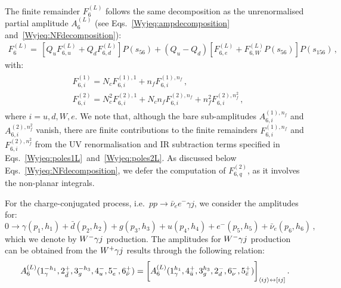 \documentclass[main.tex]{subfiles}
\begin{document}
The finite remainder $F_6^{(L)}$ follows the same decomposition as the unrenormalised partial amplitude $A_6^{(L)}$ (see Eqs.~\ref{Wyjeq:ampdecomposition} and~\ref{Wyjeq:NFdecomposition}):
\begin{equation}
\begin{aligned}
F_{6}^{(L)} = \,  \left[ Q_u F^{(L)}_{6,u} + Q_d F^{(L)}_{6,d}  \right] P(s_{56})  + (Q_u - Q_d) \left[ F^{(L)}_{6,e} + F^{(L)}_{6,W} P(s_{56}) \right] P(s_{156}) \,,
\end{aligned}
\label{Wyjeq:finremdecomposition}
\end{equation}
with:
\begin{align} \label{Wyjeq:NfDecompositionF} 
\begin{aligned}
& F^{(1)}_{6,i} = N_c F^{(1),1}_{6,i} + n_f F^{(1),n_f}_{6,i} \,, \\
& F^{(2)}_{6,i} = N_c^2 F^{(2),1}_{6,i} + N_c n_f F^{(2),n_f}_{6,i} + n_f^2 F^{(2),n_f^2}_{6,i} \,,
\end{aligned}
\end{align}
where  $i=u,d,W,e$. We note that, although the bare sub-amplitudes $A^{(1),n_f}_{6,i}$ and $A^{(2),n_f^2}_{6,i}$ vanish, there are finite contributions to the finite remainders $F^{(1),n_f}_{6,i}$
and $F^{(2),n_f^2}_{6,i}$ from the UV renormalisation and IR subtraction terms specified in Eqs.~\ref{Wyjeq:poles1L}~and~\ref{Wyjeq:poles2L}. 
As discussed below Eqs.~\ref{Wyjeq:NFdecomposition}, we defer the computation of $F^{(2)}_{6,q}$, as it involves the non-planar integrals.

For the charge-conjugated process, i.e.\ $pp \to \bar\nu_e e^- \gamma j$, we consider the amplitudes for:
\begin{equation}
0 \rightarrow \gamma(p_1,h_1)+\bar{d}(p_2,h_2)+g(p_3,h_3)+u(p_4,h_4)+e^-(p_5,h_5)+\bar\nu_e(p_6,h_6) \,, \nonumber
\end{equation}
which we denote by $W^-\gamma j$ production. The amplitudes for $W^-\gamma j$ production can be obtained from the $W^+\gamma j$ results through the following relation:
\begin{equation}  \label{Wyjeq:wmajamps}
A_{6}^{(L)}(1^{-h_1}_\gamma,2^{+}_{\bar{d}},3^{-h_3}_g,4^{-}_u,5^{-}_{e},6^{+}_{\bar\nu}) =  
\bigg[ A_{6}^{(L)}(1^{h_1}_\gamma,4^{+}_{\bar{u}},3^{h_3}_g,2^{-}_d,6^{-}_{\nu},5^{+}_{\bar{e}})\bigg]_{\langle ij\rangle \leftrightarrow [ij]} \,.
\end{equation} 
\end{document}
